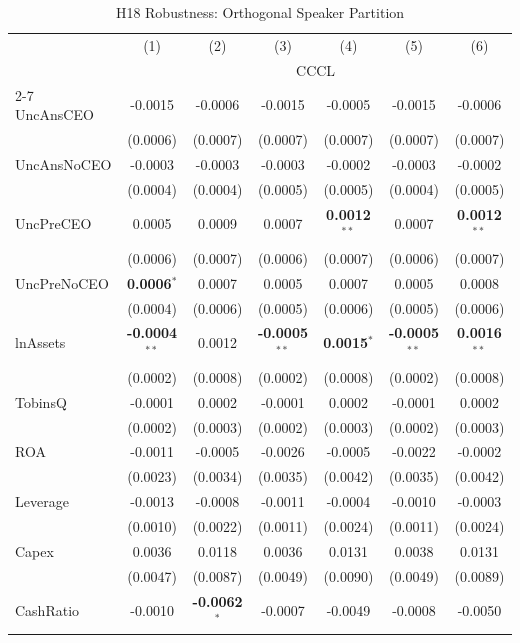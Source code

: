 \documentclass[11pt,a4paper]{article}
\begin{document}
\clearpage
\begin{table}[htbp]
\centering
\caption{H18 Robustness: Orthogonal Speaker Partition}
\label{tab:h18_robust}
\scriptsize
\begin{tabular}{lcccccc}
\toprule
 & (1) & (2) & (3) & (4) & (5) & (6) \\
 & \multicolumn{6}{c}{CCCL} \\
\cmidrule(lr){2-7}
\midrule
UncAnsCEO & -0.0015 & -0.0006 & -0.0015 & -0.0005 & -0.0015 & -0.0006 \\
 & (0.0006) & (0.0007) & (0.0007) & (0.0007) & (0.0007) & (0.0007) \\
UncAnsNoCEO & -0.0003 & -0.0003 & -0.0003 & -0.0002 & -0.0003 & -0.0002 \\
 & (0.0004) & (0.0004) & (0.0005) & (0.0005) & (0.0004) & (0.0005) \\
UncPreCEO & 0.0005 & 0.0009 & 0.0007 & \textbf{0.0012}$^{**}$ & 0.0007 & \textbf{0.0012}$^{**}$ \\
 & (0.0006) & (0.0007) & (0.0006) & (0.0007) & (0.0006) & (0.0007) \\
UncPreNoCEO & \textbf{0.0006}$^{*}$ & 0.0007 & 0.0005 & 0.0007 & 0.0005 & 0.0008 \\
 & (0.0004) & (0.0006) & (0.0005) & (0.0006) & (0.0005) & (0.0006) \\
\midrule
lnAssets & \textbf{-0.0004}$^{**}$ & 0.0012 & \textbf{-0.0005}$^{**}$ & \textbf{0.0015}$^{*}$ & \textbf{-0.0005}$^{**}$ & \textbf{0.0016}$^{**}$ \\
 & (0.0002) & (0.0008) & (0.0002) & (0.0008) & (0.0002) & (0.0008) \\
TobinsQ & -0.0001 & 0.0002 & -0.0001 & 0.0002 & -0.0001 & 0.0002 \\
 & (0.0002) & (0.0003) & (0.0002) & (0.0003) & (0.0002) & (0.0003) \\
ROA & -0.0011 & -0.0005 & -0.0026 & -0.0005 & -0.0022 & -0.0002 \\
 & (0.0023) & (0.0034) & (0.0035) & (0.0042) & (0.0035) & (0.0042) \\
Leverage & -0.0013 & -0.0008 & -0.0011 & -0.0004 & -0.0010 & -0.0003 \\
 & (0.0010) & (0.0022) & (0.0011) & (0.0024) & (0.0011) & (0.0024) \\
Capex & 0.0036 & 0.0118 & 0.0036 & 0.0131 & 0.0038 & 0.0131 \\
 & (0.0047) & (0.0087) & (0.0049) & (0.0090) & (0.0049) & (0.0089) \\
CashRatio & -0.0010 & \textbf{-0.0062}$^{*}$ & -0.0007 & -0.0049 & -0.0008 & -0.0050 \\

\end{tabular}
\end{table}
\end{document}
